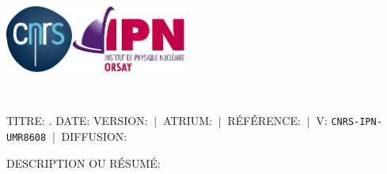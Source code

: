 \setlength{\parindent}{0cm}
\setlength{\parskip}{1ex plus 0.5ex minus 0.2ex}
\newcommand{\hsp}{\hspace{20pt}}
\newcommand{\HRule}{\rule{\linewidth}{0.3mm}}
\newcommand{\hsc}[1]{{\footnotesize\MakeUppercase{#1}}}
\makeatletter
\begin{titlepage}
    \thispagestyle{empty}
    \begin{sffamily}
        \includegraphics[width=22mm]{Files/Logos/logo_cnrs.pdf}\hfill\includegraphics[height =22mm]{Files/Logos/logo_ipn.png}
        \begin{center}
            {\Huge \expandafter\MakeUppercase\expandafter{\type}}\\[1.5cm]
            \begin{framed}
                \begin{minipage}[c]{\textwidth}%
                    {\LARGE \hsc{Titre:} \expandafter{\titre}.}
                    \newline
                    \hsc{Date:} \datee\newline
                    \hsc{Version:} \version $~\vert~$ \hsc{Atrium:} \atrium $~\vert~$  \hsc{Référence:}  $~\vert~$  \hsc{v:} \vv\newline 
                    \texttt{C\hsc{nrs}-IPN-UMR8608} $~\vert~$ \hsc{Diffusion:} \diffusion\vspace{1em}
                    
                    \hsc{Description ou résumé:}
                    
                \end{minipage}
            \end{framed}
        \end{center}
        
        \vspace{1.5cm}
        

\end{sffamily}
\end{titlepage}
